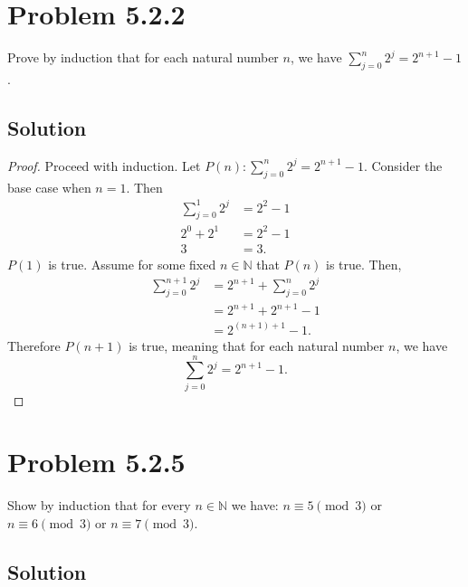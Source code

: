 \documentclass[12pt]{extarticle}
\begin{document}
\section*{Problem 5.2.2}

Prove by induction that for each natural number $n$, we have $\displaystyle\sum_{j=0}^{n} 2^j = 2^{n+1} - 1$.

\subsection*{Solution}

\begin{proof}
	Proceed with induction. Let $P(n): \displaystyle\sum_{j=0}^{n} 2^j = 2^{n+1} - 1$. Consider the base case when $n=1$. Then
	\begin{align*}
		\sum_{j=0}^{1} 2^j &= 2^2 - 1 \\
		2^0 + 2^1 &= 2^2 - 1 \\
		3 &= 3.
	\end{align*} $P(1)$ is true. Assume for some fixed $n \in \mathbb{N}$ that $P(n)$ is true. Then,
	\begin{align*}
		\sum_{j=0}^{n+1} 2^j &= 2^{n+1} + \sum_{j=0}^n 2^j \\
												 &= 2^{n+1} + 2^{n+1} - 1 \\
												 &= 2^{(n+1) + 1} - 1.
	\end{align*}
	Therefore $P(n+1)$ is true, meaning that for each natural number $n$, we have 
	\[
		\sum_{j=0}^{n} 2^j = 2^{n+1} - 1
	.\]
\end{proof}

\section*{Problem 5.2.5}

Show by induction that for every $n \in \mathbb{N}$ we have: $n \equiv 5 \pmod{3}$ or $n \equiv 6 \pmod{3}$ or $n \equiv 7 \pmod{3}$.

\subsection*{Solution}
\end{document}
